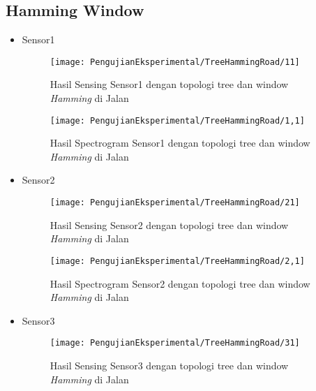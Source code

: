 \subsection{Hamming Window}
\begin{itemize}
\item Sensor1
\begin{figure}[H]
	\centering
	\texttt{[image: PengujianEksperimental/TreeHammingRoad/11]}
	\caption[Hasil Sensing Sensor1 dengan topologi tree dan window {\it Hamming} di Jalan]{Hasil Sensing Sensor1 dengan topologi tree dan window {\it Hamming} di Jalan} 
	\label{fig:hasilJalanTreeHamm11}
\end{figure}

\begin{figure}[H]
	\centering
	\texttt{[image: PengujianEksperimental/TreeHammingRoad/1,1]}
	\caption[Hasil Spectrogram Sensor1 dengan topologi tree dan window {\it Hamming} di Jalan]{Hasil Spectrogram Sensor1 dengan topologi tree dan window {\it Hamming} di Jalan} 
	\label{fig:hasilJalanTreeHamm1,1}
\end{figure}

\item Sensor2
\begin{figure}[H]
	\centering
	\texttt{[image: PengujianEksperimental/TreeHammingRoad/21]}
	\caption[Hasil Sensing Sensor2 dengan topologi tree dan window {\it Hamming} di Jalan]{Hasil Sensing Sensor2 dengan topologi tree dan window {\it Hamming} di Jalan} 
	\label{fig:hasilJalanTreeHamm21}
\end{figure}

\begin{figure}[H]
	\centering
	\texttt{[image: PengujianEksperimental/TreeHammingRoad/2,1]}
	\caption[Hasil Spectrogram Sensor2 dengan topologi tree dan window {\it Hamming} di Jalan]{Hasil Spectrogram Sensor2 dengan topologi tree dan window {\it Hamming} di Jalan} 
	\label{fig:hasilJalanTreeHamm2,1}
\end{figure}

\item Sensor3
\begin{figure}[H]
	\centering
	\texttt{[image: PengujianEksperimental/TreeHammingRoad/31]}
	\caption[Hasil Sensing Sensor3 dengan topologi tree dan window {\it Hamming} di Jalan]{Hasil Sensing Sensor3 dengan topologi tree dan window {\it Hamming} di Jalan} 
	\label{fig:hasilJalanTreeHamm31}
\end{figure}


\end{itemize}

